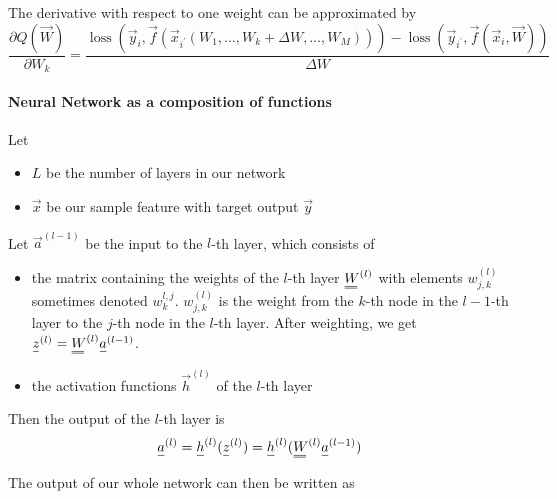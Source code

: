 The derivative with respect to one weight can be approximated by
\begin{equation}
    \frac{\partial Q(\vec{W})}{\partial W_k}=\frac{\operatorname{loss}\left(\vec{y}_i, \vec{f}\left(\vec{x}_{i^{\prime}}\left(W_1, \ldots, W_k+\Delta W, \ldots, W_M\right)\right)\right)-\operatorname{loss}\left(\vec{y}_{i^{\prime}}, \vec{f}\left(\vec{x}_i, \vec{W}\right)\right)}{\Delta W}
\end{equation}

\paragraph*{Neural Network as a composition of functions} Let
\begin{itemize}
    \item $L$ be the number of layers in our network
    \item $\vec{x}$ be our sample feature with target output $\vec{y}$
\end{itemize}
Let $\vec{a}^{(l-1)}$ be the input to the $l$-th layer, which consists of
\begin{itemize}
    \item the matrix containing the weights of the $l$-th layer $\mat{W}^{(l)}$ with elements
    $w_{j,k}^{(l)}$ sometimes denoted $w_k^{l,j}$. $w_{j,k}^{(l)}$ is the weight from the $k$-th node in the $l-1$-th layer to the $j$-th node in the $l$-th layer.
    After weighting, we get $\vec{z}^{(l)} = \mat{W}^{(l)} \vec{a}^{(l-1)}$.
    \item the activation functions $\vec{h}^{(l)}$ of the $l$-th layer
\end{itemize}
Then the output of the $l$-th layer is
\begin{equation}
    \vec{a}^{(l)} = \vec{h}^{(l)}(\vec{z}^{(l)}) = \vec{h}^{(l)}(\mat{W}^{(l)} \vec{a}^{(l-1)})
\end{equation}

The output of our whole network can then be written as

